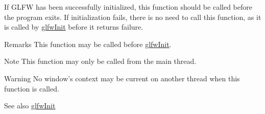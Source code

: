 \-If \-G\-L\-F\-W has been successfully initialized, this function should be called before the program exits. \-If initialization fails, there is no need to call this function, as it is called by \hyperlink{group__init_gab41771f0215a2e0afb4cf1cf98082d40}{glfw\-Init} before it returns failure.

\begin{DoxyRemark}{\-Remarks}
\-This function may be called before \hyperlink{group__init_gab41771f0215a2e0afb4cf1cf98082d40}{glfw\-Init}.
\end{DoxyRemark}
\begin{DoxyNote}{\-Note}
\-This function may only be called from the main thread.
\end{DoxyNote}
\begin{DoxyWarning}{\-Warning}
\-No window's context may be current on another thread when this function is called.
\end{DoxyWarning}
\begin{DoxySeeAlso}{\-See also}
\hyperlink{group__init_gab41771f0215a2e0afb4cf1cf98082d40}{glfw\-Init} 
\end{DoxySeeAlso}
